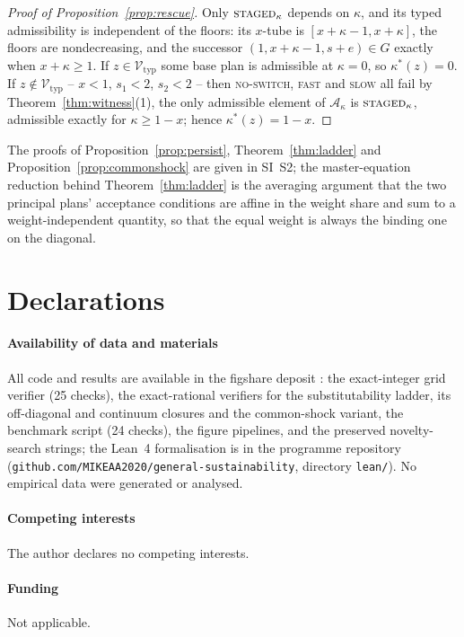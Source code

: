 \documentclass[preprint,11pt,authoryear]{elsarticle}
\theoremstyle{definition}
\theoremstyle{remark}
\newcommand{\Vtyp}{\mathcal{V}_{\mathrm{typ}}}
\newcommand{\act}[1]{\textsc{#1}}
\begin{document}
\begin{proof}[Proof of Proposition~\ref{prop:rescue}]
Only $\act{staged}_\kappa$ depends on $\kappa$, and its typed admissibility is independent of the floors: its $x$-tube is $[x+\kappa-1,x+\kappa]$, the floors are nondecreasing, and the successor $(1,x+\kappa-1,s+e)\in G$ exactly when $x+\kappa\ge1$. If $z\in\Vtyp$ some base plan is admissible at $\kappa=0$, so $\kappa^*(z)=0$. If $z\notin\Vtyp$ -- $x<1$, $s_1<2$, $s_2<2$ -- then \act{no-switch}, \act{fast} and \act{slow} all fail by Theorem~\ref{thm:witness}(1), the only admissible element of $\mathcal A_\kappa$ is $\act{staged}_\kappa$, admissible exactly for $\kappa\ge1-x$; hence $\kappa^*(z)=1-x$.
\end{proof}

\noindent The proofs of Proposition~\ref{prop:persist}, Theorem~\ref{thm:ladder} and Proposition~\ref{prop:commonshock} are given in SI~S2; the master-equation reduction behind Theorem~\ref{thm:ladder} is the averaging argument that the two principal plans' acceptance conditions are affine in the weight share and sum to a weight-independent quantity, so that the equal weight is always the binding one on the diagonal.

\section*{Declarations}
\paragraph{Availability of data and materials} All code and results are available in the figshare deposit \citep{Abaee2026code}: the exact-integer grid verifier (25 checks), the exact-rational verifiers for the substitutability ladder, its off-diagonal and continuum closures and the common-shock variant, the benchmark script (24 checks), the figure pipelines, and the preserved novelty-search strings; the Lean~4 formalisation is in the programme repository (\texttt{github.com/MIKEAA2020/general-sustainability}, directory \texttt{lean/}). No empirical data were generated or analysed.
\paragraph{Competing interests} The author declares no competing interests.
\paragraph{Funding} Not applicable.
\end{document}

